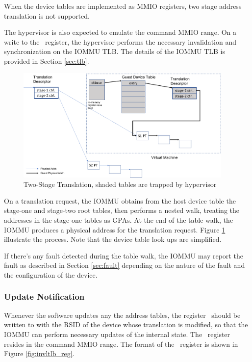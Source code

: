 When the device tables are implemented as MMIO registers, two stage address translation is
not supported.

The hypervisor is also expected to emulate the command MMIO range. On a write to the
\invltlb\ register, the hypervisor performs the necessary invalidation and
synchronization on the IOMMU TLB. The details of the IOMMU TLB is provided in Section
\ref{sec:tlb}.

\begin{figure}[ht!]
    \centering
    \includegraphics[width=0.95\textwidth]{img/two-stage-trans.pdf}
    \caption{Two-Stage Translation, shaded tables are trapped by hypervisor}
    \label{fig:two-stage-trans}
\end{figure}

On a translation request, the IOMMU obtains from the host device table the stage-one and
stage-two root tables, then performs a nested walk, treating the addresses in the
stage-one tables as GPAs.  At the end of the table walk, the IOMMU produces a physical
address for the translation request. Figure \ref{fig:two-stage-trans} illustrate the
process. Note that the device table look ups are simplified. 

If there's any fault detected during the table walk, the IOMMU may report the fault as
described in Section \ref{sec:fault} depending on the nature of the fault and the
configuration of the device.


\subsubsection{Update Notification}

Whenever the software updates any the address tables, the register \invltlb\ should be
written to with the RSID of the device whose translation is modified, so that the IOMMU
can perform necessary updates of the internal state. The \invltlb\ register resides in the
command MMIO range. The format of the \invltlb\ register is shown in Figure
\ref{fig:invltlb_reg}.

